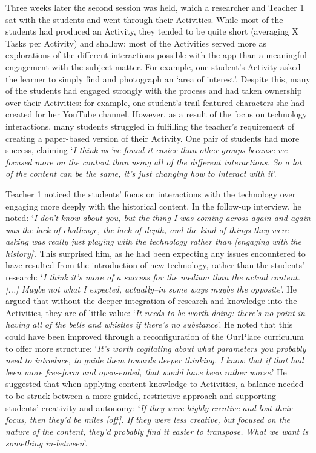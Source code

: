 \documentclass[,hyphens]{sigchi}
\begin{document}
Three weeks later the second session was held, which a researcher and Teacher 1 sat with the students and went through their Activities. While most of the students had produced an Activity, they tended to be quite short (averaging X Tasks per Activity) and shallow: most of the Activities served more as explorations of the different interactions possible with the app than a meaningful engagement with the subject matter. For example, one student's Activity asked the learner to simply find and photograph an `area of interest'. Despite this, many of the students had engaged strongly with the process and had taken ownership over their Activities: for example, one student's trail featured characters she had created for her YouTube channel. However, as a result of the focus on technology interactions, many students struggled in fulfilling the teacher's requirement of creating a paper-based version of their Activity. One pair of students had more success, claiming `\textit{I think we've found it easier than other groups because we focused more on the content than using all of the different interactions. So a lot of the content can be the same, it's just changing how to interact with it}'.

Teacher 1 noticed the students' focus on interactions with the technology over engaging more deeply with the historical content. In the follow-up interview, he noted: `\textit{I don't know about you, but the thing I was coming across again and again was the lack of challenge, the lack of depth, and the kind of things they were asking was really just playing with the technology rather than [engaging with the history]}'. This surprised him, as he had been expecting any issues encountered to have resulted from the introduction of new technology, rather than the students' research: `\textit{I think it's more of a success for the medium than the actual content. [...] Maybe not what I expected, actually--in some ways maybe the opposite}'. He argued that without the deeper integration of research and knowledge into the Activities, they are of little value: `\textit{It needs to be worth doing: there's no point in having all of the bells and whistles if there's no substance}'. He noted that this could have been improved through a reconfiguration of the OurPlace curriculum to offer more structure: `\textit{It's worth cogitating about what parameters you probably need to introduce, to guide them towards deeper thinking. I know that if that had been more free-form and open-ended, that would have been rather worse}.' He suggested that when applying content knowledge to Activities, a balance needed to be struck between a more guided, restrictive approach and supporting students' creativity and autonomy: `\textit{If they were highly creative and lost their focus, then they'd be miles [off]. If they were less creative, but focused on the nature of the content, they'd probably find it easier to transpose. What we want is something in-between}'.
\end{document}

